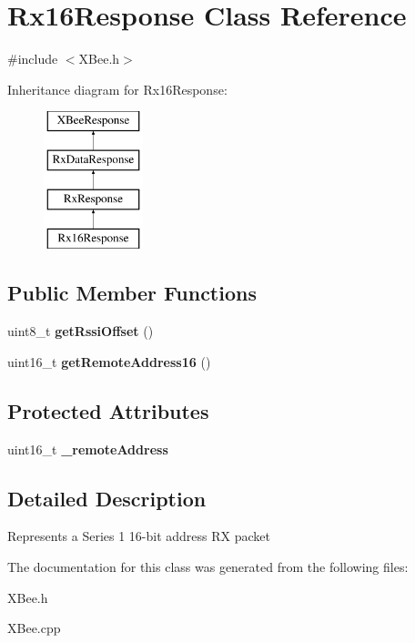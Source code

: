 \hypertarget{classRx16Response}{\section{\-Rx16\-Response \-Class \-Reference}
\label{classRx16Response}
}


{\ttfamily \#include $<$\-X\-Bee.\-h$>$}

\-Inheritance diagram for \-Rx16\-Response\-:\begin{figure}[H]
\begin{center}
\leavevmode
\includegraphics[height=4.000000cm]{classRx16Response}
\end{center}
\end{figure}
\subsection*{\-Public \-Member \-Functions}
\begin{DoxyCompactItemize}
\item 
\hypertarget{classRx16Response_ac63deea5667857ec74285daf5fab6328}{uint8\-\_\-t {\bfseries get\-Rssi\-Offset} ()}\label{classRx16Response_ac63deea5667857ec74285daf5fab6328}

\item 
\hypertarget{classRx16Response_abd8853ab7edcfa686000e81ce17983c4}{uint16\-\_\-t {\bfseries get\-Remote\-Address16} ()}\label{classRx16Response_abd8853ab7edcfa686000e81ce17983c4}

\end{DoxyCompactItemize}
\subsection*{\-Protected \-Attributes}
\begin{DoxyCompactItemize}
\item 
\hypertarget{classRx16Response_a8df57e3d897e22e4b6abdda7b2859123}{uint16\-\_\-t {\bfseries \-\_\-remote\-Address}}\label{classRx16Response_a8df57e3d897e22e4b6abdda7b2859123}

\end{DoxyCompactItemize}


\subsection{\-Detailed \-Description}
\-Represents a \-Series 1 16-\/bit address \-R\-X packet 

\-The documentation for this class was generated from the following files\-:\begin{DoxyCompactItemize}
\item 
\-X\-Bee.\-h\item 
\-X\-Bee.\-cpp\end{DoxyCompactItemize}
